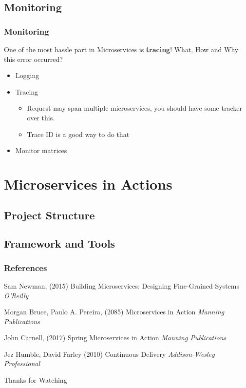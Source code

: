 \documentclass{beamer}
\begin{document}
	\subsection {Monitoring}
		\begin{frame}
			\frametitle{Monitoring}
				One of the most hassle part in Microservices is \textbf{tracing}! What, How and Why this error occurred? 
				\begin{itemize}
					\item Logging 
					\item Tracing
						\begin{itemize}
							\item \scriptsize{Request may span multiple microservices, you should have some tracker over this.}
							\item \scriptsize{Trace ID is a good way to do that}
						\end{itemize}
					\item Monitor matrices 
				\end{itemize}
			\vspace{100mm}
		\end{frame}
	
		


\section{Microservices in Actions}
	\subsection {Project Structure}
	\subsection {Framework and Tools}
	
	
\begin{frame}
\frametitle{References}
\footnotesize{
\begin{thebibliography}{99} %
 Sam Newman, (2015)
\newblock Building Microservices: Designing Fine-Grained Systems
\newblock \emph{O'Reilly}

 Morgan Bruce, Paulo A. Pereira, (2085)
\newblock Microservices in Action
\newblock \emph{Manning Publications}

 John Carnell, (2017)
\newblock Spring Microservices in Action
\newblock \emph{Manning Publications}

 Jez Humble, David Farley (2010)
\newblock Continuous Delivery
\newblock \emph{Addison-Wesley Professional}
\end{thebibliography}
}
\end{frame}


\begin{frame}
\Huge{\centerline{Thanks for Watching}}
\end{frame}

\end{document}
